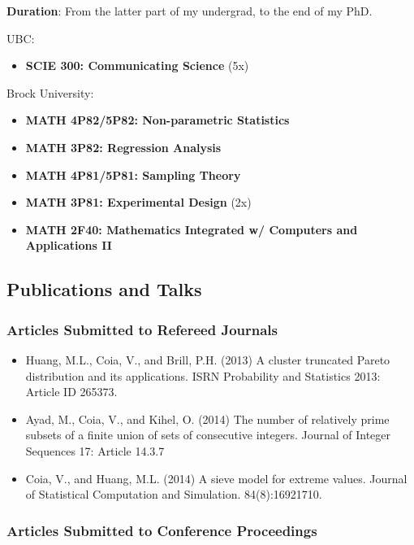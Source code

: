\documentclass[]{article}
\providecommand{\tightlist}{%
  \setlength{\itemsep}{0pt}\setlength{\parskip}{0pt}}
\begin{document}
\textbf{Duration}: From the latter part of my undergrad, to the end of my PhD.

UBC:

\begin{itemize}
\tightlist
\item
  \textbf{SCIE 300: Communicating Science} (5x)
\end{itemize}

Brock University:

\begin{itemize}
\tightlist
\item
  \textbf{MATH 4P82/5P82: Non-parametric Statistics}
\item
  \textbf{MATH 3P82: Regression Analysis}
\item
  \textbf{MATH 4P81/5P81: Sampling Theory}
\item
  \textbf{MATH 3P81: Experimental Design} (2x)
\item
  \textbf{MATH 2F40: Mathematics Integrated w/ Computers and Applications II}
\end{itemize}

\hypertarget{publications-and-talks}{%
\subsection{Publications and Talks}\label{publications-and-talks}}

\hypertarget{articles-submitted-to-refereed-journals}{%
\subsubsection{Articles Submitted to Refereed Journals}\label{articles-submitted-to-refereed-journals}}

\begin{itemize}
\item
  Huang, M.L., Coia, V., and Brill, P.H. (2013) A cluster truncated
  Pareto distribution and its applications. ISRN Probability and
  Statistics 2013: Article ID 265373.
\item
  Ayad, M., Coia, V., and Kihel, O. (2014) The number of relatively
  prime subsets of a finite union of sets of consecutive integers.
  Journal of Integer Sequences 17: Article 14.3.7
\item
  Coia, V., and Huang, M.L. (2014) A sieve model for extreme
  values. Journal of Statistical Computation and Simulation.
  84(8):16921710.
\end{itemize}

\hypertarget{articles-submitted-to-conference-proceedings}{%
\subsubsection{Articles Submitted to Conference Proceedings}\label{articles-submitted-to-conference-proceedings}}
\end{document}
